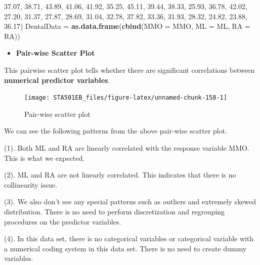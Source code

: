 \documentclass[
]{book}
\newenvironment{Shaded}{\begin{snugshade}}{\end{snugshade}}
\newcommand{\AttributeTok}[1]{\textcolor[rgb]{0.13,0.29,0.53}{#1}}
\newcommand{\FloatTok}[1]{\textcolor[rgb]{0.00,0.00,0.81}{#1}}
\newcommand{\FunctionTok}[1]{\textcolor[rgb]{0.13,0.29,0.53}{\textbf{#1}}}
\newcommand{\NormalTok}[1]{#1}
\newcommand{\OtherTok}[1]{\textcolor[rgb]{0.56,0.35,0.01}{#1}}
\providecommand{\tightlist}{%
  \setlength{\itemsep}{0pt}\setlength{\parskip}{0pt}}
\begin{document}
\begin{Shaded}
\begin{Highlighting}[]
       \FloatTok{37.07}\NormalTok{, }\FloatTok{38.71}\NormalTok{, }\FloatTok{43.89}\NormalTok{, }\FloatTok{41.06}\NormalTok{, }\FloatTok{41.92}\NormalTok{, }\FloatTok{35.25}\NormalTok{, }\FloatTok{45.11}\NormalTok{, }\FloatTok{39.44}\NormalTok{, }\FloatTok{38.33}\NormalTok{, }\FloatTok{25.93}\NormalTok{, }
       \FloatTok{36.78}\NormalTok{, }\FloatTok{42.02}\NormalTok{, }\FloatTok{27.20}\NormalTok{, }\FloatTok{31.37}\NormalTok{, }\FloatTok{27.87}\NormalTok{, }\FloatTok{28.69}\NormalTok{, }\FloatTok{31.04}\NormalTok{, }\FloatTok{32.78}\NormalTok{, }\FloatTok{37.82}\NormalTok{, }\FloatTok{33.36}\NormalTok{, }
       \FloatTok{31.93}\NormalTok{, }\FloatTok{28.32}\NormalTok{, }\FloatTok{24.82}\NormalTok{, }\FloatTok{23.88}\NormalTok{, }\FloatTok{36.17}\NormalTok{)}
\NormalTok{DentalData }\OtherTok{=} \FunctionTok{as.data.frame}\NormalTok{(}\FunctionTok{cbind}\NormalTok{(}\AttributeTok{MMO =}\NormalTok{ MMO, }\AttributeTok{ML =}\NormalTok{ ML, }\AttributeTok{RA =}\NormalTok{ RA))}
\end{Highlighting}
\end{Shaded}

\begin{itemize}
\tightlist
\item
  \textbf{Pair-wise Scatter Plot}
\end{itemize}

This pairwise scatter plot tells whether there are significant correlations between \textbf{numerical predictor variables}.

\begin{figure}

{\centering \texttt{[image: STA501EB\_files/figure-latex/unnamed-chunk-158-1]} 

}

\caption{Pair-wise scatter plot}\label{fig:unnamed-chunk-158}
\end{figure}

We can see the following patterns from the above pair-wise scatter plot.

(1). Both ML and RA are linearly correlated with the response variable MMO. This is what we expected.

(2). ML and RA are not linearly correlated. This indicates that there is no collinearity issue.

(3). We also don't see any special patterns such as outliers and extremely skewed distribution. There is no need to perform discretization and regrouping procedures on the predictor variables.

(4). In this data set, there is no categorical variables or categorical variable with a numerical coding system in this data set. There is no need to create dummy variables.
\end{document}
